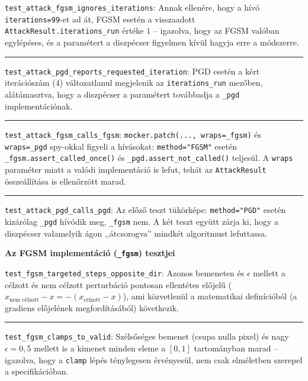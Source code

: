 \medskip
\noindent\texttt{test\_attack\_fgsm\_ignores\_iterations}: Annak ellenére, hogy a hívó \texttt{iterations=99}-et ad 
át, FGSM esetén a visszaadott \texttt{AttackResult.iterations\_run} értéke $1$ -- igazolva, hogy az FGSM valóban egylépéses, és 
a paramétert a diszpécser figyelmen kívül hagyja erre a módszerre. 

\medskip
\noindent\rule{\linewidth}{0.3pt}

\medskip
\noindent\texttt{test\_attack\_pgd\_reports\_requested\_iteration}: PGD esetén a kért iterációszám ($4$) változatlanul
megjelenik az \texttt{iterations\_run} mezőben, alátámasztva, hogy a diszpécser a paramétert továbbadja a \texttt{\_pgd} 
implementációnak. 

\medskip
\noindent\rule{\linewidth}{0.3pt}

\medskip
\noindent\texttt{test\_attack\_fgsm\_calls\_fgsm}: \texttt{mocker.patch(..., wraps=\_fgsm)} és 
\texttt{wraps=\_pgd} spy-okkal figyeli a hívásokat: \texttt{method="FGSM"} esetén \texttt{\_fgsm.assert\_called\_once()} és 
\texttt{\_pgd.assert\_not\_called()} teljesül. 
A \texttt{wraps} paraméter miatt a valódi implementáció is lefut, tehát az \texttt{AttackResult} összeállítása is ellenőrzött 
marad. 

\medskip
\noindent\rule{\linewidth}{0.3pt}

\medskip
\noindent\texttt{test\_attack\_pgd\_calls\_pgd}: Az előző teszt tükörképe: \texttt{method="PGD"} esetén
kizárólag \texttt{\_pgd} hívódik meg, \texttt{\_fgsm} nem. 
A két teszt együtt zárja ki, hogy a diszpécser valamelyik ágon ,,átcsorogva'' mindkét algoritmust lefuttassa. 

\bigskip
\noindent\textbf{Az FGSM implementáció (\texttt{\_fgsm}) tesztjei}

\medskip
\noindent\texttt{test\_fgsm\_targeted\_steps\_opposite\_dir}: Azonos bemeneten és $\epsilon$ mellett a 
célzott és nem célzott perturbáció pontosan ellentétes előjelű ($x_{\text{nem célzott}} - x = -(x_{\text{célzott}} - x)$), ami 
közvetlenül a matematikai definícióból (a gradiens előjelének megfordításából) következik. 

\medskip
\noindent\rule{\linewidth}{0.3pt}

\medskip
\noindent\texttt{test\_fgsm\_clamps\_to\_valid}: Szélsőséges bemenet (csupa nulla pixel) és nagy $\epsilon=0{,}5$
mellett is a kimenet minden eleme a $[0, 1]$ tartományban marad -- igazolva, hogy a \texttt{clamp} lépés ténylegesen érvényesül, 
nem csak elméletben szerepel a specifikációban. 

